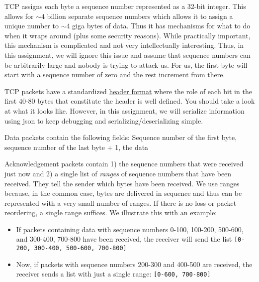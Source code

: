 \documentclass{article}
\begin{document}
TCP assigns each byte a sequence number represented as a 32-bit integer. This allows for $\sim 4$ billion separate sequence numbers which allows it to assign a unique number to $\sim 4$ giga bytes of data. Thus it has mechanisms for what to do when it wraps around (plus some security reasons). While practically important, this mechanism is complicated and not very intellectually interesting. Thus, in this assignment, we will ignore this issue and assume that sequence numbers can be arbitrarily large and nobody is trying to attack us. For us, the first byte will start with a sequence number of zero and the rest increment from there.

TCP packets have a standardized \href{https://en.wikipedia.org/wiki/Transmission\_Control\_Protocol\#TCP\_segment\_structure}{header format} where the role of each bit in the first 40-80 bytes that constitute the header is well defined. You should take a look at what it looks like. However, in this assignment, we will serialize information using json to keep debugging and serializing/deserializing simple.

Data packets contain the following fields: Sequence number of the first byte, sequence number of the last byte + 1, the data

Acknowledgement packets contain 1) the sequence numbers that were received just now and 2) a single list of \emph{ranges} of sequence numbers that have been received. They tell the sender which bytes have been received. We use ranges because, in the common case, bytes are delivered in sequence and thus can be represented with a very small number of ranges. If there is no loss or packet reordering, a single range suffices. We illustrate this with an example:

\begin{itemize}
\item If packets containing data with sequence numbers 0-100, 100-200, 500-600, and 300-400, 700-800 have been received, the receiver will send the list {\tt [0-200, 300-400, 500-600, 700-800]}
\item Now, if packets with sequence numbers 200-300 and 400-500 are received, the receiver sends a list with just a single range: {\tt [0-600, 700-800]}
\end{itemize}
\end{document}
